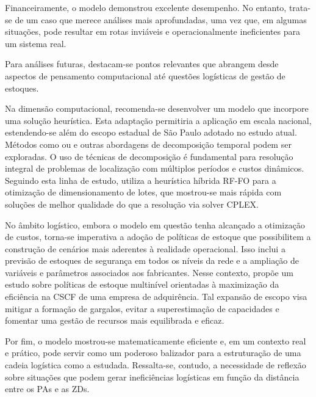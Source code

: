 Financeiramente, o modelo demonstrou excelente desempenho. No entanto, trata-se de um caso que merece análises mais aprofundadas, uma vez que, em algumas situações, pode resultar em rotas inviáveis e operacionalmente ineficientes para um sistema real.

Para análises futuras, destacam-se pontos relevantes que abrangem desde aspectos de pensamento computacional até questões logísticas de gestão de estoques.

Na dimensão computacional, recomenda-se desenvolver um modelo que incorpore uma solução heurística. Esta adaptação permitiria a aplicação em escala nacional, estendendo-se além do escopo estadual de São Paulo adotado no estudo atual. Métodos como  ou  e outras abordagens de decomposição temporal podem ser exploradas. O uso de técnicas de decomposição é fundamental para resolução integral de problemas de localização com múltiplos períodos e custos dinâmicos. Seguindo esta linha de estudo,  utiliza a heurística híbrida RF-FO para a otimização de dimensionamento de lotes, que mostrou-se mais rápida com soluções de melhor qualidade do que a resolução via solver CPLEX.

No âmbito logístico, embora o modelo em questão tenha alcançado a otimização de custos, torna-se imperativa a adoção de políticas de estoque que possibilitem a construção de cenários mais aderentes à realidade operacional. Isso inclui a previsão de estoques de segurança em todos os níveis da rede e a ampliação de variáveis e parâmetros associados aos fabricantes. Nesse contexto,  propõe um estudo sobre políticas de estoque multinível orientadas à maximização da eficiência na CSCF de uma empresa de adquirência. Tal expansão de escopo visa mitigar a formação de gargalos, evitar a superestimação de capacidades e fomentar uma gestão de recursos mais equilibrada e eficaz.

Por fim, o modelo mostrou-se matematicamente eficiente e, em um contexto real e prático, pode servir como um poderoso balizador para a estruturação de uma cadeia logística como a estudada. Ressalta-se, contudo, a necessidade de reflexão sobre situações que podem gerar ineficiências logísticas em função da distância entre os PAs e as ZDs.
